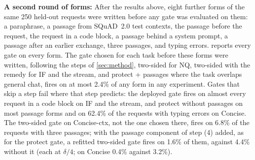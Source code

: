 \documentclass{article}
\theoremstyle{plain}
\theoremstyle{definition}
\theoremstyle{remark}
\begin{document}
\textbf{A second round of forms:} After the results above, eight further forms of the same 250 held-out
requests were written before any gate was evaluated on them: a paraphrase, a passage from SQuAD~2.0 test contexts, the passage
before the request, the request in a code block, a passage behind a system prompt, a passage after an earlier
exchange, three passages, and typing errors.  reports every gate on every form. The gate chosen for each task before these forms were written, following the
steps of \cref{sec:method}, two-sided for NQ, two-sided with the remedy for IF and the stream, and protect +
passages where the task overlaps general chat, fires on at most 2.4\% of any form in any experiment. Gates that skip
a step fail where that step predicts: the deployed gate fires on almost every request in a code block on IF and the stream,
and protect without passages on most passage forms and on 62.4\% of the requests with typing errors on Concise.
The two-sided gate on Concise-ctx, not the one chosen there, fires on 6.8\% of the requests with three passages; with
the passage component of step (4) added, as for the protect gate, a refitted two-sided gate fires on 1.6\% of them,
against 4.4\% without it (each at $\delta/4$; on Concise 0.4\% against 3.2\%).
\end{document}
